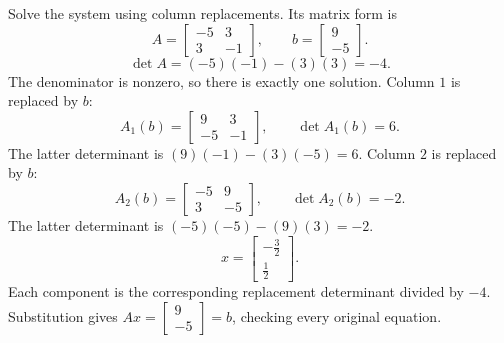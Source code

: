 \goal Solve the system using column replacements. Its matrix form is
\[A=\begin{bmatrix}-5&3\\3&-1\end{bmatrix},\qquad b=\begin{bmatrix}9\\-5\end{bmatrix}.\]
\[\det A=(-5)(-1)-(3)(3)=-4.\]
The denominator is nonzero, so there is exactly one solution.
Column $1$ is replaced by $b$:
\[A_1(b)=\begin{bmatrix}9&3\\-5&-1\end{bmatrix},\qquad\det A_1(b)=6.\]
The latter determinant is $(9)(-1)-(3)(-5)=6$.
Column $2$ is replaced by $b$:
\[A_2(b)=\begin{bmatrix}-5&9\\3&-5\end{bmatrix},\qquad\det A_2(b)=-2.\]
The latter determinant is $(-5)(-5)-(9)(3)=-2$.
\[x=\begin{bmatrix}- \frac{3}{2}\\\frac{1}{2}\end{bmatrix}.\]
Each component is the corresponding replacement determinant divided by $-4$. Substitution gives $Ax=\begin{bmatrix}9\\-5\end{bmatrix}=b$, checking every original equation.


